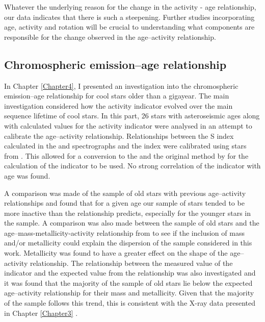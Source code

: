 Whatever the underlying reason for the change in the activity - age relationship, our data indicates that there is such a steepening. Further studies incorporating age, activity and rotation will be crucial to understanding what components are responsible for the change observed in the age--activity relationship.

\subsection{Chromospheric emission--age relationship}

In Chapter \ref{Chapter4}, I presented an investigation into the chromospheric emission--age relationship for cool stars older than a gigayear. The main investigation considered how the \Rprime activity indicator evolved over the main sequence lifetime of cool stars. In this part, 26 stars with asteroseismic ages along with calculated values for the \Rprime activity indicator were analysed in an attempt to calibrate the age--activity relationship. Relationships between the S index calculated in the \esp and \narval spectrographs and the \Smw index were calibrated using stars from \cite{Duncan_etal_1991}. This allowed for a conversion to the \Smw and the original method by \citet{Noyes_etal_1984} for the calculation of the \Rprime indicator to be used. No strong correlation of the \Rprime indicator with age was found.

A comparison was made of the sample of old stars with previous age--activity relationships and found that for a given age our sample of stars tended to be more inactive than the relationship predicts, especially for the younger stars in the sample. A comparison was also made between the sample of old stars and the age--mass-metallicity-activity relationship from \citet{Lorenzo_Oliveira_etal_2016} to see if the inclusion of mass and/or metallicity could explain the dispersion of the sample considered in this work. Metallicity was found to have a greater effect on the shape of the age--activity relationship. The relationship between the measured value of the \Rprime indicator and the expected value from the \citet{Lorenzo_Oliveira_etal_2016} relationship was also investigated and it was found that the majority of the sample of old stars lie below the expected age--activity relationship for their mass and metallicity. Given that the majority of the sample follows this trend, this is consistent with the X-ray data presented in Chapter \ref{Chapter3} \citep{Booth_etal_2017}.

